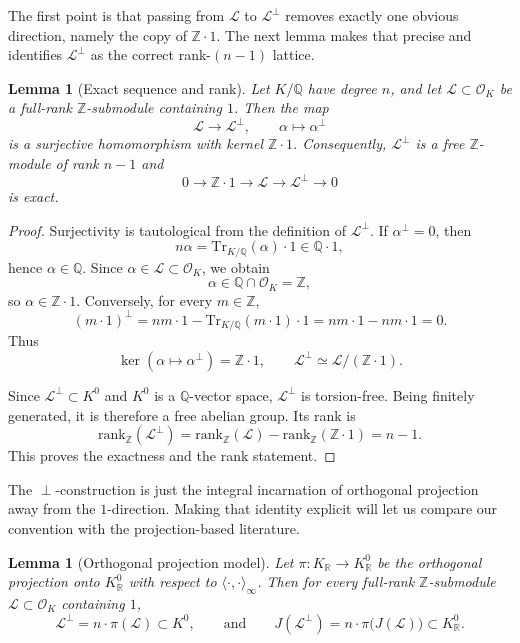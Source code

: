 \documentclass[11pt,letterpaper]{amsart}
\newcommand{\Q}{\mathbb{Q}}
\newcommand{\Z}{\mathbb{Z}}
\newcommand{\R}{\mathbb{R}}
\newcommand{\cO}{\mathcal{O}}
\newcommand{\Tr}{\mathrm{Tr}}
\theoremstyle{plain}
\newtheorem{lemma}[theorem]{Lemma}
\theoremstyle{definition}
\begin{document}
The first point is that passing from \(\mathcal L\) to \(\mathcal L^\perp\) removes exactly one obvious direction, namely the copy of \(\Z\cdot 1\). The next lemma makes that precise and identifies \(\mathcal L^\perp\) as the correct rank-\((n-1)\) lattice.

\begin{lemma}[Exact sequence and rank]\label{lem:exact-sequence}
Let $K/\Q$ have degree $n$, and let $\mathcal L\subset \cO_K$ be a full-rank $\Z$-submodule containing $1$.
Then the map
\[
\mathcal L\longrightarrow \mathcal L^\perp,\qquad \alpha\longmapsto \alpha^\perp
\]
is a surjective homomorphism with kernel $\Z\cdot 1$.
Consequently, $\mathcal L^\perp$ is a free $\Z$-module of rank $n-1$ and
\[
0\longrightarrow \Z\cdot 1\longrightarrow \mathcal L\longrightarrow \mathcal L^\perp\longrightarrow 0
\]
is exact.
\end{lemma}

\begin{proof}
Surjectivity is tautological from the definition of \(\mathcal L^\perp\).
If \(\alpha^\perp=0\), then
\[
n\alpha=\Tr_{K/\Q}(\alpha)\cdot 1\in \Q\cdot 1,
\]
hence \(\alpha\in \Q\). Since \(\alpha\in \mathcal L\subset \cO_K\), we obtain
\[
\alpha\in \Q\cap \cO_K=\Z,
\]
so \(\alpha\in \Z\cdot 1\).
Conversely, for every \(m\in\Z\),
\[
(m\cdot 1)^\perp
=nm\cdot 1-\Tr_{K/\Q}(m\cdot 1)\cdot 1
=nm\cdot 1-nm\cdot 1=0.
\]
Thus
\[
\ker(\alpha\mapsto \alpha^\perp)=\Z\cdot 1,
\qquad
\mathcal L^\perp \simeq \mathcal L/(\Z\cdot 1).
\]

Since \(\mathcal L^\perp\subset K^0\) and \(K^0\) is a \(\Q\)-vector space,
\(\mathcal L^\perp\) is torsion-free. Being finitely generated, it is therefore a free
abelian group. Its rank is
\[
\mathrm{rank}_\Z(\mathcal L^\perp)
=\mathrm{rank}_\Z(\mathcal L)-\mathrm{rank}_\Z(\Z\cdot 1)=n-1.
\]
This proves the exactness and the rank statement.
\end{proof}

The \(\perp\)-construction is just the integral incarnation of orthogonal projection away from the \(1\)-direction. Making that identity explicit will let us compare our convention with the projection-based literature.

\begin{lemma}[Orthogonal projection model]\label{lem:projection}
Let $\pi:K_\R\to K_\R^0$ be the orthogonal projection onto $K_\R^0$ with respect to
$\langle\cdot,\cdot\rangle_\infty$.
Then for every full-rank $\Z$-submodule $\mathcal L\subset \cO_K$ containing $1$,
\[
\mathcal L^\perp = n\cdot \pi(\mathcal L)\subset K^0,
\qquad\text{and}\qquad
J(\mathcal L^\perp)=n\cdot \pi\bigl(J(\mathcal L)\bigr)\subset K_\R^0.
\]
\end{lemma}
\end{document}

